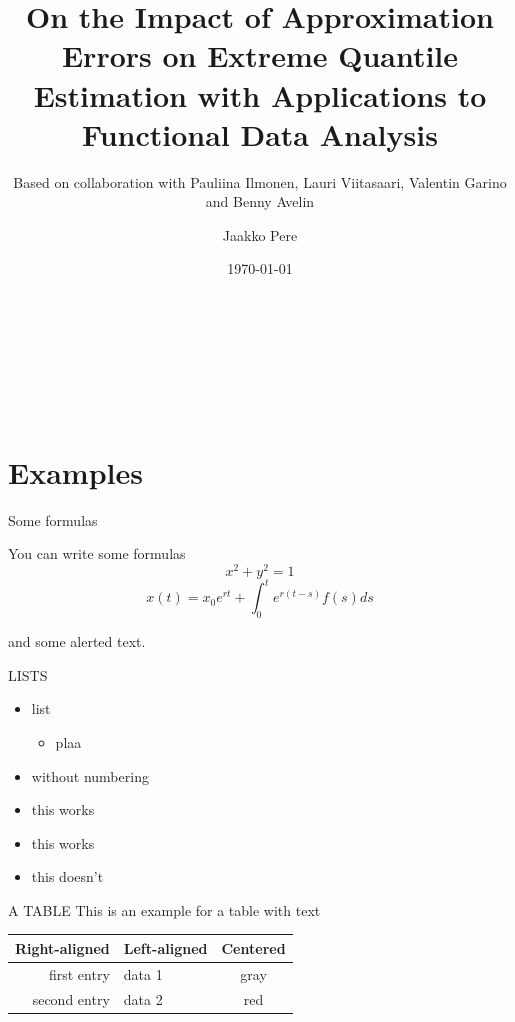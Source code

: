 \documentclass[11pt, aspectratio=169]{beamer}
\author[Jaakko Pere]{Jaakko Pere}
\title{On the Impact of Approximation Errors on Extreme Quantile Estimation with
Applications to Functional Data Analysis}
\subtitle{Based on collaboration with Pauliina Ilmonen, Lauri Viitasaari, Valentin Garino and Benny Avelin}
\date{\today}%
\institute{Dep.\ of Mathematics and Statistics, University of Helsinki}
\begin{document}
{
  \begin{frame}
    \vspace{2.5cm}
    \begin{center}
      \textcolor{hyblue}{\bf\MakeUppercase{\Large\inserttitle}} \\
      {\footnotesize\insertsubtitle} \\
      {\large\insertauthor} \\
      {\large\insertdate} \\
      {\large\insertinstitute}
    \end{center}
  \end{frame}
}


\section{Examples}

\begin{frame}{Some formulas}

You can write some formulas
$$ x^2 + y^2 = 1$$
$$ x(t) = x_0 e^{rt} + \int_0^t e^{r(t-s)}f(s) ds$$

and some \alert{alerted text}. 

\end{frame}


\begin{frame}{\MakeUppercase{Lists}}

\begin{itemize}
\item list
\begin{itemize}
  \item plaa
\end{itemize}
\item without numbering
\end{itemize}
\pause
\begin{itemize}
\item[\checkmark] this works
\item[\checkmark] this works
\item[\textcolor{red}{\ding{55}}] %
this doesn't
\end{itemize}
\end{frame}

\begin{frame}{\MakeUppercase{A table}}
\centering
This is an example for a table with text
\bigskip


\begin{tabular}{rlc}
\toprule
Right-aligned & Left-aligned & Centered\\
\midrule
first entry & data 1 & gray \\
second entry & data 2 & red\\
\bottomrule
\end{tabular}
\end{frame}
\end{document}
